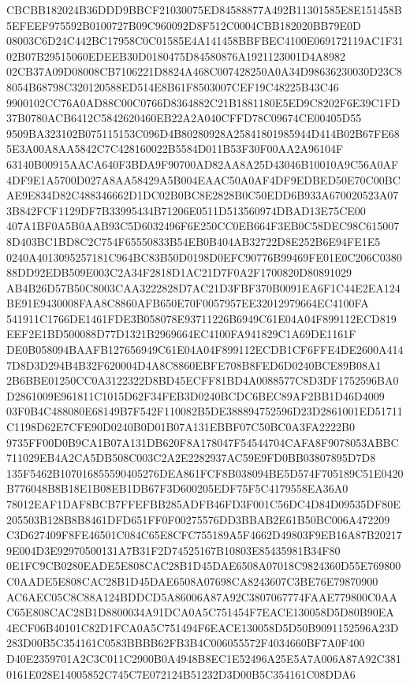 \documentclass[UTF8,fontset=fandol,zihao=-4,a4paper]{ctexart}
\begin{document}
{{CBCBB182024B36DDD9BBCF21030075ED84588877A492B11301585E8E151458B5EFEEF975592B0100727B09C960092D8F512C0004CBB182020BB79E0D
08003C6D24C442BC17958C0C01585E4A141458BBFBEC4100E069172119AC1F3102B07B29515060EDEEB30D0180475D84580876A1921123001D4A8982
02CB37A09D08008CB7106221D8824A468C007428250A0A34D98636230030D23C88054B68798C320120588ED514E8B61F8503007CEF19C48225B43C46
9900102CC76A0AD88C00C0766D8364882C21B1881180E5ED9C8202F6E39C1FD37B0780ACB6412C5842620460EB22A2A040CFFD78C09674CE00405D55
9509BA323102B075115153C096D4B80280928A25841801985944D414B02B67FE685E3A00A8AA5842C7C428160022B5584D011B53F30F00AA2A96104F
63140B00915AACA640F3BDA9F90700AD82AA8A25D43046B10010A9C56A0AF4DF9E1A5700D027A8AA58429A5B004EAAC50A0AF4DF9EDBED50E70C00BC
AE9E834D82C488346662D1DC02B0BC8E2828B0C50EDD6B933A670020523A073B842FCF1129DF7B33995434B71206E0511D513560974DBAD13E75CE00
407A1BF0A5B0AAB93C5D6032496F6E250CC0EB664F3EB0C58DEC98C6150078D403BC1BD8C2C754F65550833B54EB0B404AB32722D8E252B6E94FE1E5
0240A4013095257181C964BC83B50D0198D0EFC90776B99469FE01E0C206C038088DD92EDB509E003C2A34F2818D1AC21D7F0A2F1700820D80891029
AB4B26D57B50C8003CAA3222828D7AC21D3FBF370B0091EA6F1C44E2EA124BE91E9430008FAA8C8860AFB650E70F0057957EE32012979664EC4100FA
541911C1766DE1461FDE3B058078E93711226B6949C61E04A04F899112ECD819EEF2E1BD500088D77D1321B2969664EC4100FA941829C1A69DE1161F
DE0B058094BAAFB127656949C61E04A04F899112ECDB1CF6FFE4DE2600A4147D8D3D294B4B32F620004D4A8C8860EBFE708B8FED6D0240BCE89B08A1
2B6BBE01250CC0A3122322D8BD45ECFF81BD4A0088577C8D3DF1752596BA0D2861009E961811C1015D62F34FEB3D0240BCDC6BEC89AF2BB1D46D4009
03F0B4C488080E68149B7F542F110082B5DE388894752596D23D2861001ED51711C1198D62E7CFE90D0240B0D01B07A131EBBF07C50BC0A3FA2222B0
9735FF00D0B9CA1B07A131DB620F8A178047F54544704CAFA8F9078053ABBC711029EB4A2CA5DB508C003C2A2E2282937AC59E9FD0BB03807895D7D8
135F5462B107016855590405276DEA861FCF8B038094BE5D574F705189C51E0420B776048B8B18E1B08EB1DB67F3D600205EDF75F5C4179558EA36A0
78012EAF1DAF8BCB7FFEFBB285ADFB46FD3F001C56DC4D84D09535DF80E205503B128B8B8461DFD651FF0F00275576DD3BBAB2E61B50BC006A472209
C3D627409F8FE46501C084C65E8CFC755189A5F4662D49803F9EB16A87B202179E004D3E92970500131A7B31F2D74525167B10803E85435981B34F80
0E1FC9CB0280EADE5E808CAC28B1D45DAE6508A07018C9824360D55E769800C0AADE5E808CAC28B1D45DAE6508A07698CA8243607C3BE76E79870900
AC6AEC05C8C88A124BDDCD5A86006A87A92C3807067774FAAE779800C0AAC65E808CAC28B1D8800034A91DCA0A5C751454F7EACE130058D5D80B90EA
4ECF06B40101C82D1FCA0A5C751494F6EACE130058D5D50B9091152596A23D283D00B5C354161C0583BBBB62FB3B4C006055572F4034660BF7A0F400
D40E2359701A2C3C011C2900B0A4948B8EC1E52496A25E5A7A006A87A92C3810161E028E14005852C745C7E072124B51232D3D00B5C354161C08DDA6
}}
\end{document}

